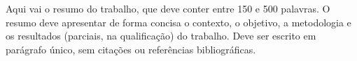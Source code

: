 
\begin{resumo}
  \noindent Aqui vai o resumo do trabalho, que deve conter entre 150 e 500 palavras. O resumo deve apresentar de forma concisa o contexto, o objetivo, a metodologia e os resultados (parciais, na qualificação) do trabalho. Deve ser escrito em parágrafo único, sem citações ou referências bibliográficas.
\end{resumo}
